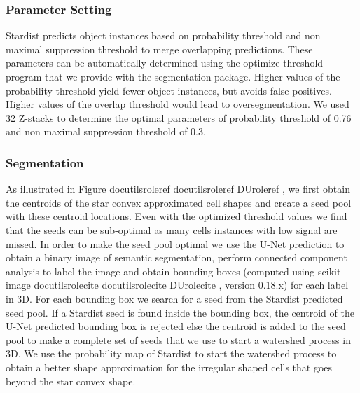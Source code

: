 \documentclass[letterpaper,compsoc,twoside,onecolumn]{IEEEtran}
\providecommand*{\DUrole}[2]{%
  \ifcsname docutilsrole#1\endcsname%
    \csname docutilsrole#1\endcsname{#2}%
  \else
    \csname DUrole#1\endcsname{#2}%
  \fi%
}
\begin{document}
\subsubsection{Parameter Setting%
  \label{parameter-setting}%
}


Stardist predicts object instances based on probability threshold and non maximal suppression threshold to merge overlapping predictions. These parameters can be automatically determined using the optimize threshold program that we provide with the segmentation package. Higher values of the probability threshold yield fewer object instances, but avoids false positives. Higher values of the overlap threshold would lead to oversegmentation. We used 32 Z-stacks to determine the optimal parameters of probability threshold of 0.76 and non maximal suppression threshold of 0.3.

\subsubsection{Segmentation%
  \label{segmentation}%
}


As illustrated in Figure \DUrole{ref}{algorithm}, we first obtain the centroids of the star convex approximated cell shapes and create a seed pool with these centroid locations. Even with the optimized threshold values we find that the seeds can be sub-optimal as many cells instances with low signal are missed. In order to make the seed pool optimal we use the U-Net prediction to obtain a binary image of semantic segmentation, perform connected component analysis to label the image and obtain bounding boxes (computed using scikit-image \DUrole{cite}{scikit-image}, version 0.18.x) for each label in 3D. For each bounding box we search for a seed from the Stardist predicted seed pool. If a Stardist seed is found inside the bounding box, the centroid of the U-Net predicted bounding box is rejected else the centroid is added to the seed pool to make a complete set of seeds that we use to start a watershed process in 3D. We use the probability map of Stardist to start the watershed process to obtain a better shape approximation for the irregular shaped cells that goes beyond the star convex shape.
\end{document}
